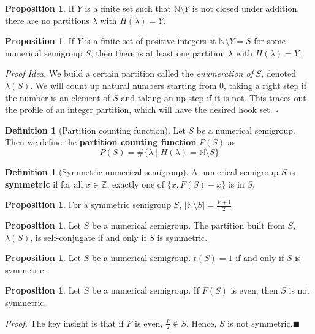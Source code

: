 \documentclass{article}
\theoremstyle{definition}
\theoremstyle{definition}
\newtheorem{defn}[thm]{Definition}
\theoremstyle{definition}
\newtheorem{prop}[thm]{Proposition}
\begin{document}
\begin{prop}
    If $Y$ is a finite set such that $\mathbb{N} \setminus Y$ is not closed under addition, there are no partitions $\lambda$ with $H(\lambda) = Y$.
\end{prop}

\begin{prop}
    If $Y$ is a finite set of positive integers st $\mathbb{N} \setminus Y = S$ for some numerical semigroup $S$, then there is at least one partition $\lambda$ with $H(\lambda) = Y$.

    \textit{Proof Idea.} We build a certain partition called the \textit{enumeration of} $S$, denoted $\lambda(S)$. We will count up natural numbers starting from $0$, taking a right step if the number is an element of $S$ and taking an up step if it is not. This traces out the profile of an integer partition, which will have the desired hook set. $\square$ 
\end{prop}

\begin{defn}[Partition counting function]
    Let $S$ be a numerical semigroup. Then we define the \textbf{partition counting function} $P(S)$ as
    $$P(S) = \#\{\lambda \mid H(\lambda) = \mathbb{N} \setminus S\}$$
\end{defn}

\begin{defn}[Symmetric numerical semigroup]
    A numerical semigroup $S$ is \textbf{symmetric} if for all $x \in \mathbb{Z}$, exactly one of $\{x, F(S)-x\}$ is in $S$.
\end{defn}

\begin{prop}
    For a symmetric semigroup $S$, $|\mathbb{N} \setminus S| = \frac{F+1}{2}$
\end{prop}

\begin{prop}
    Let $S$ be a numerical semigroup. The partition built from $S$, $\lambda(S)$, is self-conjugate if and only if $S$ is symmetric.
\end{prop}

\begin{prop}
    Let $S$ be a numerical semigroup. $t(S) = 1$ if and only if $S$ is symmetric.
\end{prop}

\begin{prop}
    Let $S$ be a numerical semigroup. If $F(S)$ is even, then $S$ is not symmetric. 

    \textit{Proof. } The key insight is that if $F$ is even, $\frac{F}{2} \notin S$. Hence, $S$ is not symmetric.$\blacksquare$
\end{prop}
\end{document}
